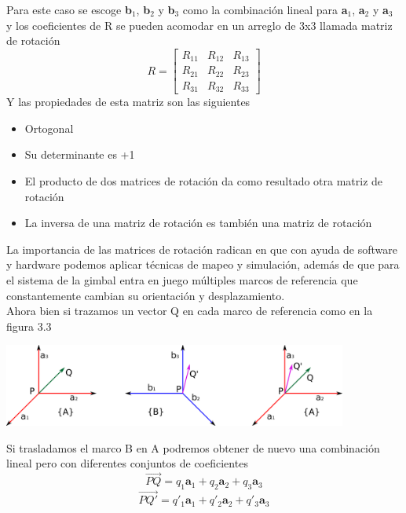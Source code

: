 Para este caso se escoge \textbf{b}$_1$, \textbf{b}$_2$ y \textbf{b}$_3$ como la combinación
lineal para \textbf{a}$_1$, \textbf{a}$_2$ y \textbf{a}$_3$ y los coeficientes de R se
pueden acomodar en un arreglo de 3x3 llamada matriz de rotación
\begin{equation}
	R=
	\begin{bmatrix}
		R_{11} & R_{12} & R_{13} \\
		R_{21} & R_{22} & R_{23} \\
		R_{31} & R_{32} & R_{33}
	\end{bmatrix}
\end{equation}
Y las propiedades de esta matriz son las siguientes
\begin{itemize}
	\item Ortogonal
	\item Su determinante es +1
	\item El producto de dos matrices de rotación da como resultado otra matriz de rotación
	\item La inversa de una matriz de rotación es también una matriz de rotación
\end{itemize}
La importancia de las matrices de rotación radican en que con ayuda de software y hardware
podemos aplicar técnicas de mapeo y simulación, además de que para el sistema de la gimbal
entra en juego múltiples marcos de referencia que constantemente cambian su orientación y
desplazamiento.\\
Ahora bien si trazamos un vector Q en cada marco de referencia como en la figura 3.3
\begin{center}
	\includegraphics[width=0.85\textwidth]{Contenido/Cuerpo/Capitulo3/Fig12.eps}
	\label{fig:ModeloMat:Fig1}
\end{center}
Si trasladamos el marco B en A podremos obtener de nuevo una combinación lineal pero con
diferentes conjuntos de coeficientes
\begin{equation}
	\overrightarrow{PQ} = q_1\textbf{a}_1 + q_2\textbf{a}_2 + q_3\textbf{a}_3
\end{equation}
\begin{equation}
	\overrightarrow{PQ'} = q'_1\textbf{a}_1 + q'_2\textbf{a}_2 + q'_3\textbf{a}_3
\end{equation}
